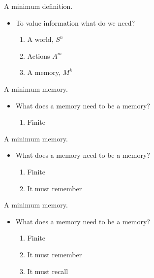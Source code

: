\documentclass[10pt]{beamer}
\begin{document}
\begin{frame}[fragile]{A minimum definition.}
\begin{itemize}
    \item To value information what do we need?
    \begin{enumerate}
        \item A world, $S^n$
        \item Actions $A^m$
        \item A memory, $M^k$
    \end{enumerate}
\end{itemize}
\end{frame}
        
\begin{frame}[fragile]{A minimum memory.}
\begin{itemize}
    \item What does a memory need to be a memory?
    \begin{enumerate}
        \item Finite
    \end{enumerate}
\end{itemize}
\end{frame}

\begin{frame}[fragile]{A minimum memory.}
\begin{itemize}
    \item What does a memory need to be a memory?
    \begin{enumerate}
        \item Finite
        \item It must remember
    \end{enumerate}
\end{itemize}
\end{frame}

\begin{frame}[fragile]{A minimum memory.}
\begin{itemize}
    \item What does a memory need to be a memory?
    \begin{enumerate}
        \item Finite
        \item It must remember
        \item It must recall
    \end{enumerate}
\end{itemize}
\end{frame}
\end{document}

